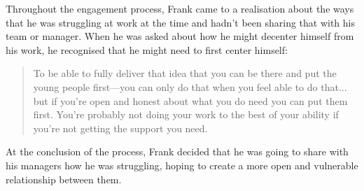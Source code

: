 Throughout the engagement process, Frank came to a realisation about the ways that he was struggling at work at the time and hadn't been sharing that with his team or manager. When he was asked about how he might decenter himself from his work, he recognised that he might need to first center himself:
\begin{quote}
To be able to fully deliver that idea that you can be there and put the young people first—you can only do that when you feel able to do that... but if you're open and honest about what you do need you can put them first. You're probably not doing your work to the best of your ability if you're not getting the support you need.
\end{quote}
At the conclusion of the process, Frank decided that he was going to share with his managers how he was struggling, hoping to create a more open and vulnerable relationship between them. 

